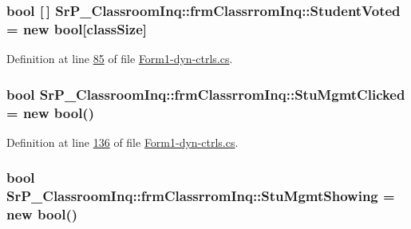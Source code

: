 \hypertarget{class_sr_p___classroom_inq_1_1frm_classrrom_inq_a1a7e4f2ef2b99a4a641431918fedf7f5}{
\subsubsection[{\-Student\-Voted}]{\setlength{\rightskip}{0pt plus 5cm}bool \mbox{[}$\,$\mbox{]} {\bf \-Sr\-P\-\_\-\-Classroom\-Inq\-::frm\-Classrrom\-Inq\-::\-Student\-Voted} = new bool\mbox{[}{\bf class\-Size}\mbox{]}}}
\label{class_sr_p___classroom_inq_1_1frm_classrrom_inq_a1a7e4f2ef2b99a4a641431918fedf7f5}


\-Definition at line \hyperlink{_form1-dyn-ctrls_8cs_source_l00085}{85} of file \hyperlink{_form1-dyn-ctrls_8cs_source}{\-Form1-\/dyn-\/ctrls.\-cs}.

\hypertarget{class_sr_p___classroom_inq_1_1frm_classrrom_inq_ad0a57ebb96913cfbb9622d8c4c7b52cb}{
\subsubsection[{\-Stu\-Mgmt\-Clicked}]{\setlength{\rightskip}{0pt plus 5cm}bool {\bf \-Sr\-P\-\_\-\-Classroom\-Inq\-::frm\-Classrrom\-Inq\-::\-Stu\-Mgmt\-Clicked} = new bool()}}
\label{class_sr_p___classroom_inq_1_1frm_classrrom_inq_ad0a57ebb96913cfbb9622d8c4c7b52cb}


\-Definition at line \hyperlink{_form1-dyn-ctrls_8cs_source_l00136}{136} of file \hyperlink{_form1-dyn-ctrls_8cs_source}{\-Form1-\/dyn-\/ctrls.\-cs}.

\hypertarget{class_sr_p___classroom_inq_1_1frm_classrrom_inq_a6a40312dc72ead57d8d40d415ee14a07}{
\subsubsection[{\-Stu\-Mgmt\-Showing}]{\setlength{\rightskip}{0pt plus 5cm}bool {\bf \-Sr\-P\-\_\-\-Classroom\-Inq\-::frm\-Classrrom\-Inq\-::\-Stu\-Mgmt\-Showing} = new bool()}}
\label{class_sr_p___classroom_inq_1_1frm_classrrom_inq_a6a40312dc72ead57d8d40d415ee14a07}


